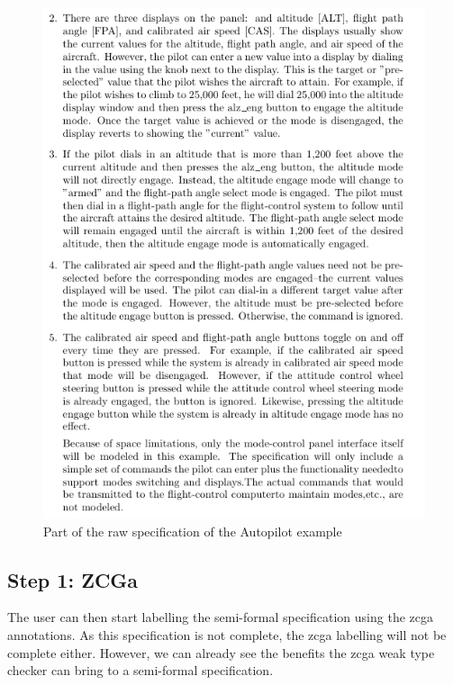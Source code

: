 \begin{figure}[H]
\begin{minipage}{0.45\textwidth}
    \includegraphics[width=\textwidth]{Figures/fullexample/0auto2.png}
    \end{minipage}
    \caption{Part of the raw specification of the Autopilot example \label{fig:rawautocomp}}
    \end{figure}



 \subsection{Step 1: ZCGa}

 The user can then start labelling the semi-formal specification using the
 \gls{zcga} annotations. As this specification is not complete, the \gls{zcga}
 labelling will not be complete either. However, we can already see the benefits the
 \gls{zcga} weak type checker can bring to a semi-formal specification.

